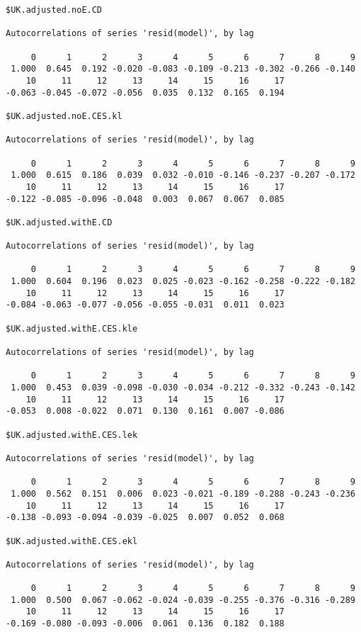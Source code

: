 \documentclass[preprint,authoryear,12pt]{elsarticle}\usepackage[]{graphicx}\usepackage[]{color}
\makeatletter
\newenvironment{kframe}{%
 \def\at@end@of@kframe{}%
 \ifinner\ifhmode%
  \def\at@end@of@kframe{\end{minipage}}%
  \begin{minipage}{\columnwidth}%
 \fi\fi%
 \def\FrameCommand##1{\hskip\@totalleftmargin \hskip-\fboxsep
 \colorbox{shadecolor}{##1}\hskip-\fboxsep
     \hskip-\linewidth \hskip-\@totalleftmargin \hskip\columnwidth}%
 \MakeFramed {\advance\hsize-\width
   \@totalleftmargin\z@ \linewidth\hsize
   \@setminipage}}%
 {\par\unskip\endMakeFramed%
 \at@end@of@kframe}
\newenvironment{knitrout}{}{} %
\makeatother
\begin{document}
\begin{knitrout}
\begin{kframe}
\begin{verbatim}
$UK.adjusted.noE.CD

Autocorrelations of series 'resid(model)', by lag

     0      1      2      3      4      5      6      7      8      9 
 1.000  0.645  0.192 -0.020 -0.083 -0.109 -0.213 -0.302 -0.266 -0.140 
    10     11     12     13     14     15     16     17 
-0.063 -0.045 -0.072 -0.056  0.035  0.132  0.165  0.194 

$UK.adjusted.noE.CES.kl

Autocorrelations of series 'resid(model)', by lag

     0      1      2      3      4      5      6      7      8      9 
 1.000  0.615  0.186  0.039  0.032 -0.010 -0.146 -0.237 -0.207 -0.172 
    10     11     12     13     14     15     16     17 
-0.122 -0.085 -0.096 -0.048  0.003  0.067  0.067  0.085 

$UK.adjusted.withE.CD

Autocorrelations of series 'resid(model)', by lag

     0      1      2      3      4      5      6      7      8      9 
 1.000  0.604  0.196  0.023  0.025 -0.023 -0.162 -0.258 -0.222 -0.182 
    10     11     12     13     14     15     16     17 
-0.084 -0.063 -0.077 -0.056 -0.055 -0.031  0.011  0.023 

$UK.adjusted.withE.CES.kle

Autocorrelations of series 'resid(model)', by lag

     0      1      2      3      4      5      6      7      8      9 
 1.000  0.453  0.039 -0.098 -0.030 -0.034 -0.212 -0.332 -0.243 -0.142 
    10     11     12     13     14     15     16     17 
-0.053  0.008 -0.022  0.071  0.130  0.161  0.007 -0.086 

$UK.adjusted.withE.CES.lek

Autocorrelations of series 'resid(model)', by lag

     0      1      2      3      4      5      6      7      8      9 
 1.000  0.562  0.151  0.006  0.023 -0.021 -0.189 -0.288 -0.243 -0.236 
    10     11     12     13     14     15     16     17 
-0.138 -0.093 -0.094 -0.039 -0.025  0.007  0.052  0.068 

$UK.adjusted.withE.CES.ekl

Autocorrelations of series 'resid(model)', by lag

     0      1      2      3      4      5      6      7      8      9 
 1.000  0.500  0.067 -0.062 -0.024 -0.039 -0.255 -0.376 -0.316 -0.289 
    10     11     12     13     14     15     16     17 
-0.169 -0.080 -0.093 -0.006  0.061  0.136  0.182  0.188 
\end{verbatim}
\end{kframe}
\end{knitrout}
\end{document}
